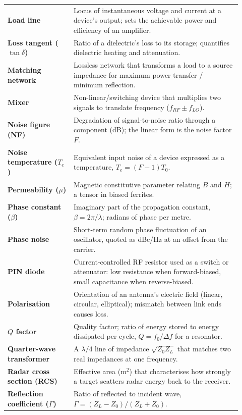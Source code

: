 \begin{longtable}{>{\raggedright\arraybackslash}p{0.26\linewidth}>{\raggedright\arraybackslash}p{0.66\linewidth}}
\textbf{Load line} & Locus of instantaneous voltage and current at a device's output; sets the achievable power and efficiency of an amplifier. \\
\textbf{Loss tangent ($\tan\delta$)} & Ratio of a dielectric's loss to its storage; quantifies dielectric heating and attenuation. \\
\textbf{Matching network} & Lossless network that transforms a load to a source impedance for maximum power transfer / minimum reflection. \\
\textbf{Mixer} & Non-linear/switching device that multiplies two signals to translate frequency ($f_{RF}\pm f_{LO}$). \\
\textbf{Noise figure (NF)} & Degradation of signal-to-noise ratio through a component (dB); the linear form is the noise factor $F$. \\
\textbf{Noise temperature ($T_e$)} & Equivalent input noise of a device expressed as a temperature, $T_e=(F-1)T_0$. \\
\textbf{Permeability ($\mu$)} & Magnetic constitutive parameter relating $B$ and $H$; a tensor in biased ferrites. \\
\textbf{Phase constant ($\beta$)} & Imaginary part of the propagation constant, $\beta=2\pi/\lambda$; radians of phase per metre. \\
\textbf{Phase noise} & Short-term random phase fluctuation of an oscillator, quoted as dBc/Hz at an offset from the carrier. \\
\textbf{PIN diode} & Current-controlled RF resistor used as a switch or attenuator: low resistance when forward-biased, small capacitance when reverse-biased. \\
\textbf{Polarisation} & Orientation of an antenna's electric field (linear, circular, elliptical); mismatch between link ends causes loss. \\
\textbf{$Q$ factor} & Quality factor; ratio of energy stored to energy dissipated per cycle, $Q=f_0/\Delta f$ for a resonator. \\
\textbf{Quarter-wave transformer} & A $\lambda/4$ line of impedance $\sqrt{Z_0 Z_L}$ that matches two real impedances at one frequency. \\
\textbf{Radar cross section (RCS)} & Effective area ($\text{m}^2$) that characterises how strongly a target scatters radar energy back to the receiver. \\
\textbf{Reflection coefficient ($\Gamma$)} & Ratio of reflected to incident wave, $\Gamma=(Z_L-Z_0)/(Z_L+Z_0)$. \\

\end{longtable}
